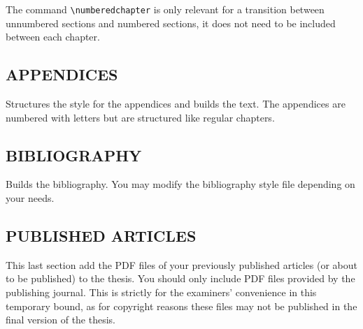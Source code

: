 The command \texttt{\textbackslash numberedchapter} is only relevant for a transition between unnumbered sections and numbered sections, it does not need to be included between each chapter. 

\subsection{APPENDICES}

Structures the style for the appendices and builds the text. The appendices are numbered with letters but are structured like regular chapters.

\subsection{BIBLIOGRAPHY}

Builds the bibliography. You may modify the bibliography style file depending on your needs.

\subsection{PUBLISHED ARTICLES}

This last section add the PDF files of your previously published articles (or about to be published) to the thesis. You should only include PDF files provided by the publishing journal. This is strictly for the examiners' convenience in this temporary bound, as for copyright reasons these files may not be published in the final version of the thesis.